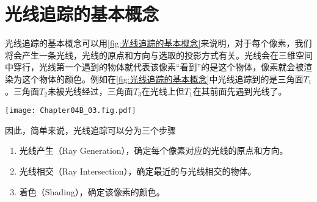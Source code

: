 \section{光线追踪的基本概念}

光线追踪的基本概念可以用\cref{fig:光线追踪的基本概念}来说明，对于每个像素，我们将会产生一条光线，光线的原点和方向与选取的投影方式有关。光线会在三维空间中穿行，光线第一个遇到的物体就代表该像素“看到”的是这个物体，像素就会被渲染为这个物体的颜色。例如在\cref{fig:光线追踪的基本概念}中光线追踪到的是三角面$T_1$。三角面$T_2$未被光线经过，三角面$T_3$在光线上但$T_1$在其前面先遇到光线了。
\begin{Figure}[光线追踪的基本概念]
    \texttt{[image: Chapter04B\_03.fig.pdf]}
\end{Figure}

因此，简单来说，光线追踪可以分为三个步骤
\begin{enumerate}
    \item 光线产生（Ray Generation），确定每个像素对应的光线的原点和方向。
    \item 光线相交（Ray Intersection），确定最近的与光线相交的物体。
    \item 着色（Shading），确定该像素的颜色。
\end{enumerate}
